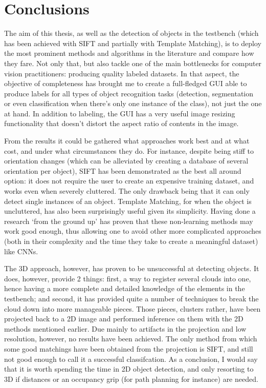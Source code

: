 \documentclass[../main.tex]{subfiles}
\begin{document}
\section{Conclusions}

The aim of this thesis, as well as the detection of objects in the testbench (which has been achieved with SIFT and partially with Template Matching), is to deploy the most prominent methods and algorithms in the literature and compare how they fare. Not only that, but also tackle one of the main bottlenecks for computer vision practitioners: producing quality labeled datasets. In that aspect, the objective of completeness has brought me to create a full-fledged GUI able to produce labels for all types of object recognition tasks (detection, segmentation or even classification when there's only one instance of the class), not just the one at hand. In addition to labeling, the GUI has a very useful image resizing functionality that doesn't distort the aspect ratio of contents in the image.

From the results it could be gathered what approaches work best and at what cost, and under what circumstances they do. For instance, despite being stiff to orientation changes (which can be alleviated by creating a database of several orientation per object), SIFT has been demonstrated as the best all around option: it does not require the user to create an expensive training dataset, and works even when severely cluttered. The only drawback being that it can only detect single instances of an object. Template Matching, for when the object is uncluttered, has also been surprisingly useful given its simplicity. Having done a research `from the ground up' has proven that these non-learning methods may work good enough, thus allowing one to avoid other more complicated approaches (both in their complexity and the time they take to create a meaningful dataset) like CNNs.

The 3D approach, however, has proven to be unsuccessful at detecting objects. It does, however, provide 2 things: first, a way to register several clouds into one, hence having a more complete and detailed knowledge of the elements in the testbench; and second, it has provided quite a number of techniques to break the cloud down into more manageable pieces. Those pieces, clusters rather, have been projected back to a 2D image and performed inference on them with the 2D methods mentioned earlier. Due mainly to artifacts in the projection and low resolution, however, no results have been achieved. The only method from which some good matchings have been obtained from the projection is SIFT, and still not good enough to call it a successful classifcation. As a conclusion, I would say that it is worth spending the time in 2D object detection, and only resorting to 3D if distances or an occupancy grip (for path planning for instance) are needed.
\end{document}
